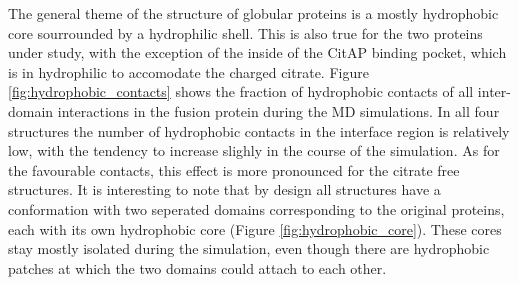 \documentclass[english, a4paper, 12pt, titlepage, draft]{article}
\begin{document}
The general theme of the structure of globular proteins is a mostly hydrophobic core sourrounded by a hydrophilic shell.
This is also true for the two proteins under study, with the exception of the inside of the CitAP binding pocket, which is in hydrophilic to accomodate the charged citrate.
Figure \ref{fig:hydrophobic_contacts} shows the fraction of hydrophobic contacts of all inter-domain interactions in the fusion protein during the MD simulations.
In all four structures the number of hydrophobic contacts in the interface region is relatively low, with the tendency to increase slighly in the course of the simulation.
As for the favourable contacts, this effect is more pronounced for the citrate free structures.
It is interesting to note that by design all structures have a conformation with two seperated domains corresponding to the original proteins, each with its own hydrophobic core (Figure \ref{fig:hydrophobic_core}).
These cores stay mostly isolated during the simulation, even though there are hydrophobic patches at which the two domains could attach to each other.
\end{document}
